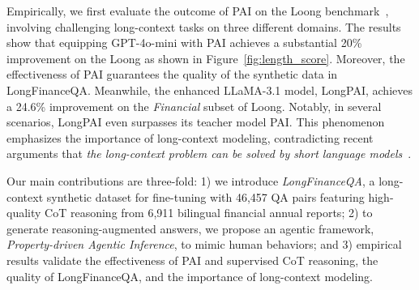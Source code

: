 Empirically, we first evaluate the outcome of PAI on the Loong benchmark~\cite{wang2024leave}, involving challenging long-context tasks on three different domains. The results show that equipping GPT-4o-mini with PAI achieves a substantial 20\% improvement on the Loong as shown in Figure~\ref{fig:length_score}. Moreover, the effectiveness of PAI guarantees the quality of the synthetic data in LongFinanceQA. Meanwhile, the enhanced LLaMA-3.1 model, LongPAI, achieves a 24.6\% improvement on the \textit{Financial} subset of Loong.
Notably, in several scenarios, LongPAI even surpasses its teacher model PAI. This phenomenon emphasizes the importance of long-context modeling, contradicting recent arguments that \textit{the long-context problem can be solved by short language models}~\cite{qian2024long,chen2024long}.

Our main contributions are three-fold: 1) we introduce \emph{LongFinanceQA}, a long-context synthetic dataset for fine-tuning with 46,457 QA pairs featuring high-quality CoT reasoning from 6,911 bilingual financial annual reports; 2) to generate reasoning-augmented answers, we propose an agentic framework, \emph{Property-driven Agentic Inference}, to mimic human behaviors; and 3) empirical results validate the effectiveness of PAI and supervised CoT reasoning, the quality of LongFinanceQA, and the importance of long-context modeling.
